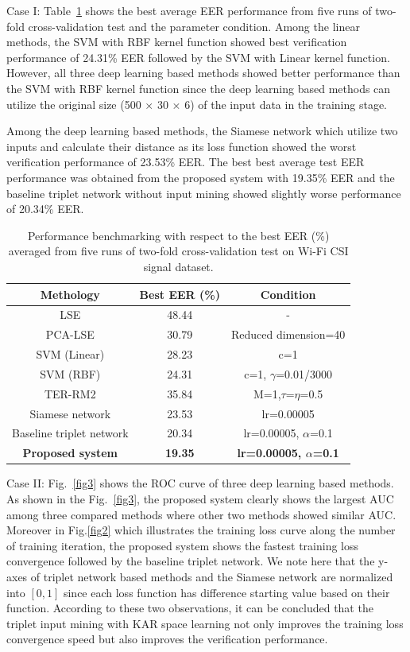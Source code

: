 \documentclass[runningheads]{llncs}
\begin{document}
Case I: Table~\ref{tab3} shows the best average EER performance from five runs of two-fold cross-validation test and the parameter condition. Among the linear methods, the SVM with RBF kernel function showed best verification performance of 24.31\% EER followed by the SVM with Linear kernel function. However, all three deep learning based methods showed better performance than the SVM with RBF kernel function since the deep learning based methods can utilize the original size (500 $\times$ 30 $\times$ 6) of the input data in the training stage.

Among the deep learning based methods, the Siamese network which utilize two inputs and calculate their distance as its loss function showed the worst verification performance of 23.53\% EER. The best best average test EER performance was obtained from the proposed system with 19.35\% EER and the baseline triplet network without input mining showed slightly worse performance of 20.34\% EER.

\begin{table}[!h]
    \caption{Performance benchmarking with respect to the best EER (\%) averaged from five runs of two-fold cross-validation test on Wi-Fi CSI signal dataset.}\label{tab3}
    \centering
    \begin{tabular}{|c|c|c|}
    \hline
    Methology   &   Best EER (\%) &   Condition   \\  \hline
    LSE &   48.44   &  - \\ 
    PCA-LSE    &   30.79   &  Reduced dimension=40    \\
    SVM (Linear) &   28.23   &   c=1 \\
    SVM (RBF)    &   24.31   &   c=1, $\gamma$=0.01/3000 \\
    TER-RM2 &   35.84   &  M=1,$\tau$=$\eta$=0.5   \\     \hline
    Siamese network  &   23.53   &   lr=0.00005  \\
    Baseline triplet network &   20.34   &   lr=0.00005, $\alpha$=0.1  \\
    \textbf{Proposed system} &   \textbf{19.35}   &  \textbf{lr=0.00005, $\alpha$=0.1}  \\
     \hline
    \end{tabular}
\end{table}

Case II: Fig.~\ref{fig3} shows the ROC curve of three deep learning based methods. As shown in the Fig.~\ref{fig3}, the proposed system clearly shows the largest AUC among three compared methods where other two methods showed similar AUC. Moreover in Fig.\ref{fig2} which illustrates the training loss curve along the number of training iteration, the proposed system shows the fastest training loss convergence followed by the baseline triplet network. We note here that the y-axes of triplet network based methods and the Siamese network are normalized into $[0,1]$ since each loss function has difference starting value based on their function. According to these two observations, it can be concluded that the triplet input mining with KAR space learning not only improves the training loss convergence speed but also improves the verification performance.
\end{document}
